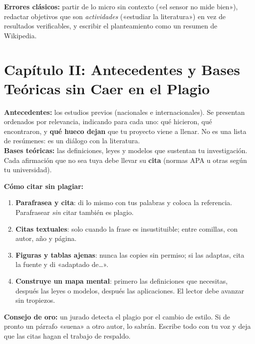 \documentclass[12pt, letterpaper]{article}
\begin{document}
\begin{cuadroadvertencia}
  \textbf{Errores clásicos:} partir de lo micro sin contexto («el sensor no mide bien»), redactar objetivos que son \emph{actividades} («estudiar la literatura») en vez de resultados verificables, y escribir el planteamiento como un resumen de Wikipedia.
\end{cuadroadvertencia}

\section{Capítulo II: Antecedentes y Bases Teóricas sin Caer en el Plagio}

\begin{cuadroteoria}
  \textbf{Antecedentes:} los estudios previos (nacionales e internacionales). Se presentan ordenados por relevancia, indicando para cada uno: qué hicieron, qué encontraron, y \textbf{qué hueco dejan} que tu proyecto viene a llenar. No es una lista de resúmenes: es un diálogo con la literatura.
  \\[4pt]
  \textbf{Bases teóricas:} las definiciones, leyes y modelos que sustentan tu investigación. Cada afirmación que no sea tuya debe llevar su \textbf{cita} (normas APA u otras según tu universidad).
\end{cuadroteoria}

\noindent\textbf{Cómo citar sin plagiar:}

\begin{enumerate}[leftmargin=*]
  \item \textbf{Parafrasea y cita}: di lo mismo con tus palabras y coloca la referencia. Parafrasear \emph{sin} citar también es plagio.
  \item \textbf{Citas textuales}: solo cuando la frase es insustituible; entre comillas, con autor, año y página.
  \item \textbf{Figuras y tablas ajenas}: nunca las copies sin permiso; si las adaptas, cita la fuente y di «adaptado de\ldots».
  \item \textbf{Construye un mapa mental}: primero las definiciones que necesitas, después las leyes o modelos, después las aplicaciones. El lector debe avanzar sin tropiezos.
\end{enumerate}

\begin{cuadroextra}
  \small
  \textbf{Consejo de oro:} un jurado detecta el plagio por el cambio de estilo. Si de pronto un párrafo «suena» a otro autor, lo sabrán. Escribe todo con tu voz y deja que las citas hagan el trabajo de respaldo.
\end{cuadroextra}
\end{document}
